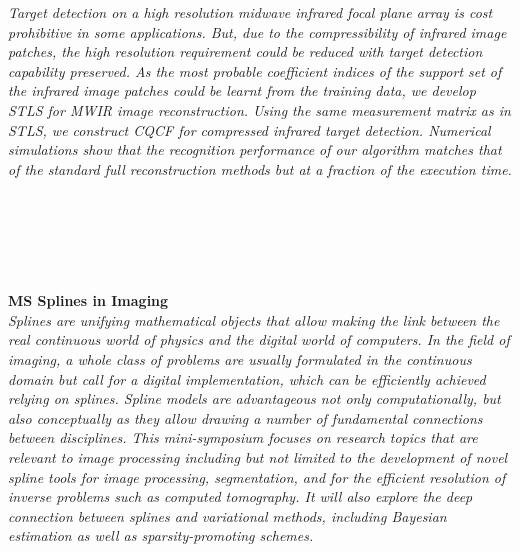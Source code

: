 \begin{multicols}{2}
\\ 
        \\
        \\\\
\\
      \textit{Target detection on a high resolution midwave infrared focal plane array is cost prohibitive in some applications.  But, due to the compressibility of infrared image patches, the high resolution requirement could be reduced with target detection capability preserved. As the most probable coefficient indices of the support set of the infrared image patches could be learnt from the training data, we develop STLS for MWIR image reconstruction. Using the same measurement matrix as in STLS, we construct CQCF for compressed infrared target detection. Numerical simulations show that the recognition performance of our algorithm matches that of the standard full reconstruction methods but at a fraction of the execution time.}\\
\\ 
        \\
        \\\\
\\
\end{multicols}
  \noindent\textbf{MS Splines in Imaging}\\
  \textit{Splines are unifying mathematical objects that allow making the link between the real continuous world of physics and the digital world of computers. In the field of imaging, a whole class of problems are usually formulated in the continuous domain but call for a digital implementation, which can be efficiently achieved relying on splines. Spline models are advantageous not only computationally, but also conceptually as they allow drawing a number of fundamental connections between disciplines. This mini-symposium focuses on research topics that are relevant to image processing including but not limited to the development of novel spline tools for image processing, segmentation, and for the efficient resolution of inverse problems such as computed tomography. It will also explore the deep connection between splines and variational methods, including Bayesian estimation as well as sparsity-promoting schemes.} \\
    
